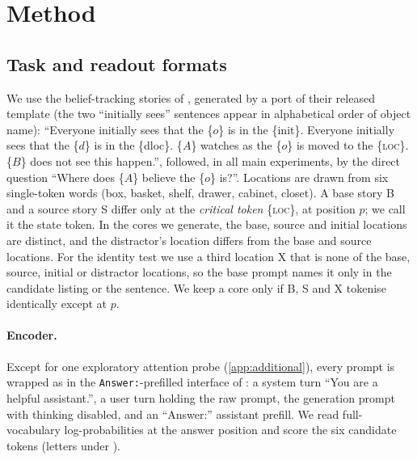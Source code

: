 \section{Method}\label{sec:method}

\ifdefined\lemma\else\newtheorem{lemma}{Lemma}\fi

\subsection{Task and readout formats}\label{sec:method-task}

We use the belief-tracking stories of \citet{anonymous2026fitted}, generated by a port of their released template (the two ``initially sees'' sentences appear in alphabetical order of object name):
``Everyone initially sees that the \{$o$\} is in the \{init\}. Everyone initially sees that the \{$d$\} is in the \{dloc\}. \{$A$\} watches as the \{$o$\} is moved to the \{\textsc{loc}\}. \{$B$\} does not see this happen.'',
followed, in all main experiments, by the direct question ``Where does \{$A$\} believe the \{$o$\} is?''.
Locations are drawn from six single-token words (box, basket, shelf, drawer, cabinet, closet).
A base story B and a source story S differ only at the \emph{critical token} \{\textsc{loc}\}, at position $p$; we call it the state token.
In the cores we generate, the base, source and initial locations are distinct, and the distractor's location differs from the base and source locations.
For the identity test we use a third location X that is none of the base, source, initial or distractor locations, so the base prompt names it only in the candidate listing or the \fmtPost{} sentence.
We keep a core only if B, S and X tokenise identically except at $p$.

\paragraph{Encoder.} Except for one exploratory attention probe (\cref{app:additional}), every prompt is wrapped as in the \texttt{Answer:}-prefilled interface of \citet{anonymous2026fitted}: a system turn ``You are a helpful assistant.'', a user turn holding the raw prompt, the generation prompt with thinking disabled, and an ``Answer:'' assistant prefill.
We read full-vocabulary log-probabilities at the answer position and score the six candidate tokens (letters under \fmtLetter{}).

